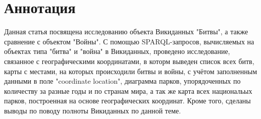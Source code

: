 \section{Аннотация}

Данная статья посвящена исследованию объекта Викиданных "Битвы", а также сравнение с объектом "Войны". С помощью SPARQL-запросов, вычисляемых на объектах типа "битва" и "война" в Викиданных, проведено исследование, связанное с географическими координатами, в которм выведен список всех битв, карты с местами, на которых происходили битвы и войны, с учётом заполненным данными в поле "coordinate location", диаграмма парков, упорядоченных по количеству за разные годы и по странам мира, а так же карта всех национальых парков, построенная на основе географических координат. Кроме того, сделаны выводы по поводу полноты Викиданных по данной теме.